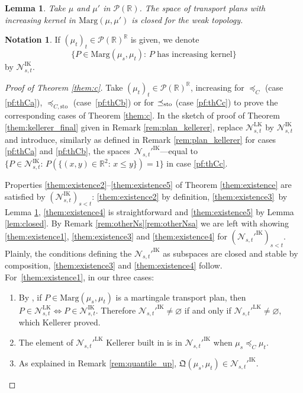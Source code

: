 \documentclass[11pt]{article}
\theoremstyle{plain}
\newtheorem{lem}[them]{Lemma}
\theoremstyle{definition}
\newtheorem{notation}[them]{Notation} %
\newcommand{\como}{\mathfrak{Q}}
\newcommand{\ML}{\mathrm{LK}}
\newcommand{\IT}{\mathrm{IK}}
\newcommand{\p}{\mathcal{P}}
\newcommand{\ma}{\mathrm{Marg}}
\newcommand{\R}{\mathbb{R}}
\newcommand{\sto}{\mathrm{sto}}
\newcommand{\leqc}{\preceq_{C}}
\newcommand{\leqcs}{\preceq_{C,\sto}}
\newcommand{\leqs}{\preceq_{\text{\rm sto}}}
\begin{document}
\begin{lem}\label{lem:transitions_croissantes_limite} Take $\mu$ and $\mu'$ in $\p(\R)$. The space of transport plans with increasing kernel in $\ma(\mu,\mu')$ is closed for the weak topology.
\end{lem}

\begin{notation}\label{nota:Nik}If $(\mu_t)_t\in\p(\R)^\R$ is given, we denote
\[
\{P\in\ma(\mu_s,\mu_t):\,P\text{ has increasing kernel}\}
\]
by $\mathcal{N}^\IT_{s,t}$.
\end{notation}

\begin{proof}[Proof of Theorem \ref{them:c}] Take $(\mu_t)_t\in\p(\R)^\R$, increasing for $\leqc$ (case \eqref{pf:thCa}), $\leqcs$ (case~\eqref{pf:thCb}) or for $\leqs$ (case \eqref{pf:thCc}) to prove the corresponding cases of Theorem \ref{them:c}. In the sketch of proof of Theorem \ref{them:kellerer_final} given in Remark \ref{rem:plan_kellerer}, replace $\mathcal{N}^\ML_{s,t}$ by $\mathcal{N}^\IT_{s,t}$ and introduce, similarly as defined in Remark \ref{rem:plan_kellerer} for cases \eqref{pf:thCa} and \eqref{pf:thCb}, the spaces~$\mathcal{N}_{s,t}'^\IT$---equal to
$\{P\in\mathcal{N}^\IT_{s,t}:\,P(\{(x,y)\in\R^2:\,x\leqslant y\})=1\}$ in case \eqref{pf:thCc}.

Properties \eqref{them:existence2}--\eqref{them:existence5} of Theorem \ref{them:existence} are satisfied by $(\mathcal{N}^\IT_{s,t})_{s<t}$: \eqref{them:existence2} by definition, \eqref{them:existence3}~by Lemma \ref{lem:transitions_croissantes_limite}, \eqref{them:existence4} is straightforward and \eqref{them:existence5} by Lemma \ref{lem:closed}. By Remark \ref{rem:otherNs}\eqref{rem:otherNsa} we are left with showing \eqref{them:existence1}, \eqref{them:existence3} and \eqref{them:existence4} for $(\mathcal{N}_{s,t}'^\IT)_{s<t}$. Plainly, the conditions defining the $\mathcal{N}_{s,t}'^\IT$ as subspaces are closed and stable by composition, \eqref{them:existence3} and \eqref{them:existence4} follow. For~\eqref{them:existence1}, in our three cases:
\begin{enumerate}
\item\label{pf:thCa}
By \cite[\S 3.1]{BHS}, if $P\in\ma(\mu_s,\mu_t)$ is a martingale transport plan, then $P\in\mathcal{N}_{s,t}^\ML\Leftrightarrow P\in\mathcal{N}_{s,t}^\IT$. Therefore $\mathcal{N}_{s,t}'^\IT\neq\varnothing$ if and only if $\mathcal{N}_{s,t}'^\ML\neq\varnothing$, which Kellerer proved.

\item\label{pf:thCb}
The element of $\mathcal{N}_{s,t}'^\ML$ Kellerer built in \cite[Def.\,7 \& Th.\,2]{Ke72} is in $\mathcal{N}_{s,t}'^\IT$ when $\mu_s\leqc\mu_t$.

\item\label{pf:thCc}
As explained in Remark \ref{rem:quantile_up}, $\como(\mu_s,\mu_t)\in \mathcal{N}_{s,t}'^\IT$.\qedhere
\end{enumerate}
\end{proof}
\end{document}
